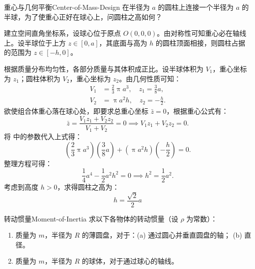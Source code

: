 \begin{problem}{重心与几何平衡}{Center-of-Mass-Design}
    在半径为 $a$ 的圆柱上连接一个半径为 $a$ 的半球，为了使重心正好在球心上，问圆柱之高如何？
\end{problem}

\begin{solution}
    建立空间直角坐标系，设球心位于原点 $O(0, 0, 0)$。由对称性可知重心必在轴线上。设半球位于上方 $z \in [0, a]$，其底面与高为 $h$ 的圆柱顶面相接，则圆柱占据的范围为 $z \in [-h, 0]$。

    根据质量分布均匀性，各部分质量与其体积成正比。设半球体积为 $V_1$，重心坐标为 $z_1$；圆柱体积为 $V_2$，重心坐标为 $z_2$。由几何性质可知：
    \begin{equation}
        \label{eq:Geometry-Params}
        \begin{aligned}
            V_1 & = \frac{2}{3} \uppi a^3, \quad z_1 = \frac{3}{8} a, \\
            V_2 & = \uppi a^2 h, \quad z_2 = -\frac{h}{2}.
        \end{aligned}
    \end{equation}
    欲使组合体重心落在球心处，即要求总重心坐标 $\bar{z} = 0$，根据重心公式有：
    \begin{equation}
        \bar{z} = \frac{V_1 z_1 + V_2 z_2}{V_1 + V_2} = 0 \implies V_1 z_1 + V_2 z_2 = 0.
    \end{equation}
    将  中的参数代入上式得：
    \begin{equation}
        \left( \frac{2}{3} \uppi a^3 \right) \left( \frac{3}{8} a \right) + ( \uppi a^2 h ) \left( -\frac{h}{2} \right) = 0.
    \end{equation}
    整理方程可得：
    \begin{equation}
        \frac{1}{4} a^4 - \frac{1}{2} a^2 h^2 = 0 \implies h^2 = \frac{1}{2} a^2.
    \end{equation}
    考虑到高度 $h > 0$，求得圆柱之高为：
    \begin{equation}
        \boxed{h = \frac{\sqrt{2}}{2} a}
    \end{equation}
\end{solution}

\begin{problem}{转动惯量}{Moment-of-Inertia}
    求以下各物体的转动惯量（设 $\rho$ 为常数）：
    \begin{enumerate}
        \item 质量为 $m$，半径为 $R$ 的薄圆盘，对于：(a) 通过圆心并垂直圆盘的轴； (b) 直径。
        \item 质量为 $m$，半径为 $R$ 的球体，对于通过球心的轴线。
    \end{enumerate}
\end{problem}

